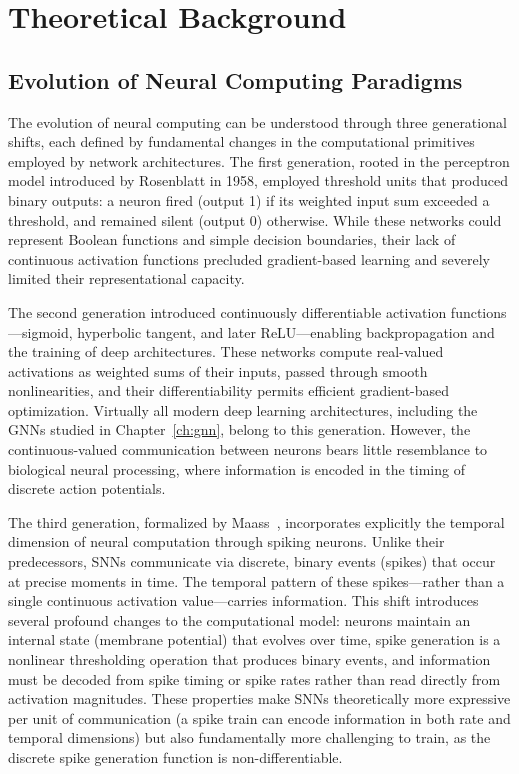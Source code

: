 \section{Theoretical Background}

\subsection{Evolution of Neural Computing Paradigms}

The evolution of neural computing can be understood through three generational shifts, each defined by fundamental changes in the computational primitives employed by network architectures. The first generation, rooted in the perceptron model introduced by Rosenblatt in 1958, employed threshold units that produced binary outputs: a neuron fired (output 1) if its weighted input sum exceeded a threshold, and remained silent (output 0) otherwise. While these networks could represent Boolean functions and simple decision boundaries, their lack of continuous activation functions precluded gradient-based learning and severely limited their representational capacity.

The second generation introduced continuously differentiable activation functions---sigmoid, hyperbolic tangent, and later ReLU---enabling backpropagation and the training of deep architectures. These networks compute real-valued activations as weighted sums of their inputs, passed through smooth nonlinearities, and their differentiability permits efficient gradient-based optimization. Virtually all modern deep learning architectures, including the GNNs studied in Chapter~\ref{ch:gnn}, belong to this generation. However, the continuous-valued communication between neurons bears little resemblance to biological neural processing, where information is encoded in the timing of discrete action potentials.

The third generation, formalized by Maass~\cite{maass1997networks}, incorporates explicitly the temporal dimension of neural computation through spiking neurons. Unlike their predecessors, SNNs communicate via discrete, binary events (spikes) that occur at precise moments in time. The temporal pattern of these spikes---rather than a single continuous activation value---carries information. This shift introduces several profound changes to the computational model: neurons maintain an internal state (membrane potential) that evolves over time, spike generation is a nonlinear thresholding operation that produces binary events, and information must be decoded from spike timing or spike rates rather than read directly from activation magnitudes. These properties make SNNs theoretically more expressive per unit of communication (a spike train can encode information in both rate and temporal dimensions) but also fundamentally more challenging to train, as the discrete spike generation function is non-differentiable.

